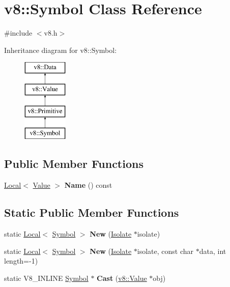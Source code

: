 \hypertarget{classv8_1_1_symbol}{}\section{v8\+:\+:Symbol Class Reference}
\label{classv8_1_1_symbol}


{\ttfamily \#include $<$v8.\+h$>$}

Inheritance diagram for v8\+:\+:Symbol\+:\begin{figure}[H]
\begin{center}
\leavevmode
\includegraphics[height=4.000000cm]{classv8_1_1_symbol}
\end{center}
\end{figure}
\subsection*{Public Member Functions}
\begin{DoxyCompactItemize}
\item 
\hypertarget{classv8_1_1_symbol_af1c1ccf079ac99e0db858c30e6458587}{}\hyperlink{classv8_1_1_local}{Local}$<$ \hyperlink{classv8_1_1_value}{Value} $>$ {\bfseries Name} () const \label{classv8_1_1_symbol_af1c1ccf079ac99e0db858c30e6458587}

\end{DoxyCompactItemize}
\subsection*{Static Public Member Functions}
\begin{DoxyCompactItemize}
\item 
\hypertarget{classv8_1_1_symbol_a546e3cf37fddc735503a5f07b95295c9}{}static \hyperlink{classv8_1_1_local}{Local}$<$ \hyperlink{classv8_1_1_symbol}{Symbol} $>$ {\bfseries New} (\hyperlink{classv8_1_1_isolate}{Isolate} $\ast$isolate)\label{classv8_1_1_symbol_a546e3cf37fddc735503a5f07b95295c9}

\item 
\hypertarget{classv8_1_1_symbol_a713b8ddd0d38bf9281f4a3d6f1e22125}{}static \hyperlink{classv8_1_1_local}{Local}$<$ \hyperlink{classv8_1_1_symbol}{Symbol} $>$ {\bfseries New} (\hyperlink{classv8_1_1_isolate}{Isolate} $\ast$isolate, const char $\ast$data, int length=-\/1)\label{classv8_1_1_symbol_a713b8ddd0d38bf9281f4a3d6f1e22125}

\item 
\hypertarget{classv8_1_1_symbol_a6bb214df5e2d8655379a648530aebaf1}{}static V8\+\_\+\+I\+N\+L\+I\+N\+E \hyperlink{classv8_1_1_symbol}{Symbol} $\ast$ {\bfseries Cast} (\hyperlink{classv8_1_1_value}{v8\+::\+Value} $\ast$obj)\label{classv8_1_1_symbol_a6bb214df5e2d8655379a648530aebaf1}

\end{DoxyCompactItemize}


